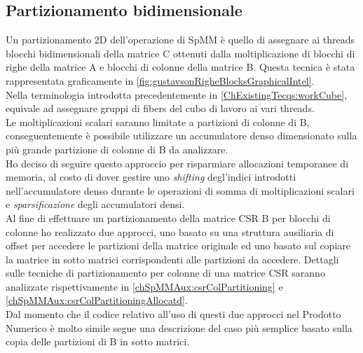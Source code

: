 \subsection{Partizionamento bidimensionale} \label{chSpMMNum:parti2D}
Un partizionamento 2D dell'operazione di SpMM è quello di assegnare ai threads 
blocchi bidimensionali della matrice C ottenuti dalla moltiplicazione di
blocchi di righe della matrice A e blocchi di colonne della matrice B.
Questa tecnica è stata rappresentata graficamente in \ref{fig:gustavsonRigheBlocksGraphicalIntel}.\\
Nella terminologia introdotta precedentemente in \ref{ChExistingTecqs:workCube}, equivale ad
assegnare gruppi di fibers del cubo di lavoro ai vari threads.\\
\voidLine
Le moltiplicazioni scalari saranno limitate a partizioni di colonne di B,
conseguentemente è possibile utilizzare un accumulatore denso dimensionato sulla più grande
partizione di colonne di B da analizzare.\\
Ho deciso di seguire questo approccio per risparmiare allocazioni temporanee di memoria, 
al costo di dover gestire uno \emph{shifting} degl'indici introdotti nell'accumulatore denso
durante le operazioni di
somma di moltiplicazioni scalari e \emph{sparsificazione} degli accumulatori densi.\\
\label{chSpMMNum:csrColPartitioning}
Al fine di effettuare un partizionamento della matrice CSR B per blocchi di colonne 
ho realizzato due approcci, uno basato su una struttura ausiliaria di offset per accedere le partizioni della matrice originale
ed uno basato sul copiare la matrice in sotto matrici corrispondenti alle partizioni da accedere.
Dettagli sulle tecniche di partizionamento per colonne di una matrice CSR saranno analizzate
rispettivamente in \ref{chSpMMAux:csrColPartitioning} e \ref{chSpMMAux:csrColPartitioningAllocatd}.\\
Dal momento che il codice relativo all'uso di questi due approcci nel Prodotto Numerico è molto simile
segue una descrizione del caso più semplice basato sulla copia delle partizioni di B in sotto matrici.\\

